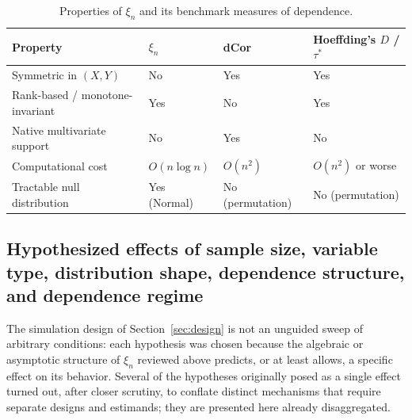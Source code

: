 \documentclass[article]{ajs}
\begin{document}
\begin{table}[H]
\caption{\label{tab:comparison}Properties of $\xi_n$ and its benchmark measures of dependence.}
\begin{center}
\small
\begin{tabular}{p{4.2cm}p{1.6cm}p{2.1cm}p{2.6cm}}
\toprule
Property & $\xi_n$ & dCor & Hoeffding's $D$ / $\tau^\ast$ \\
\midrule
Symmetric in $(X,Y)$ & No & Yes & Yes \\[2pt]
Rank-based / monotone-invariant & Yes & No & Yes \\[2pt]
Native multivariate support & No\footnotemark & Yes & No \\[2pt]
Computational cost & $O(n \log n)$ & $O(n^2)$\footnotemark & $O(n^2)$ or worse \\[2pt]
Tractable null distribution & Yes (Normal) & No (permutation) & No (permutation) \\
\bottomrule
\end{tabular}
\end{center}
\end{table}

\subsection{Hypothesized effects of sample size, variable type, distribution shape, dependence structure, and dependence regime}

The simulation design of Section~\ref{sec:design} is not an unguided
sweep of arbitrary conditions: each hypothesis was chosen because the
algebraic or asymptotic structure of $\xi_n$ reviewed above predicts,
or at least allows, a specific effect on its behavior. Several of the
hypotheses originally posed as a single effect turned out, after
closer scrutiny, to conflate distinct mechanisms that require separate
designs and estimands; they are presented here already disaggregated.
\end{document}
